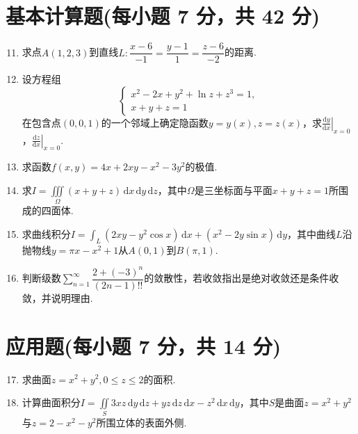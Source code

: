 \documentclass[../Main.tex]{subfiles}
\begin{document}
\section{基本计算题(每小题 7 分，共 42 分)}
\begin{enumerate}
    \setcounter{enumi}{10}
    \item 求点$A(1,2,3)$到直线$L:\dfrac{x-6}{-1}=\dfrac{y-1}{1}=\dfrac{z-6}{-2}$的距离.
          \vspace{11em}

    \item 设方程组
          \[
              \begin{cases}
                  x^{2}-2x+y^{2}+\ln z+z^{3}=1, \\
                  x+y+z=1
              \end{cases}
          \]
          在包含点$(0,0,1)$的一个邻域上确定隐函数$y=y(x),z=z(x)$，求\( \left.\frac{\mathrm{d}y}{\mathrm{d}x}\right|_{x=0}\)，\(\left.\frac{\mathrm{d}z}{\mathrm{d}x}\right|_{x=0} \).
          \vspace{8em}

    \item 求函数$f(x,y)=4x+2xy-x^{2}-3y^{2}$的极值.
          \vspace{8em}

    \item 求$I=\iiint\limits_{\Omega}(x+y+z)\,\mathrm{d}x\,\mathrm{d}y\,\mathrm{d}z$，其中$\Omega$是三坐标面与平面$x+y+z=1$所围成的四面体.
          \vspace{9em}

    \item 求曲线积分$I=\int_{L}(2xy-y^{2}\cos x)\,\mathrm{d}x+(x^{2}-2y\sin x)\,\mathrm{d}y$，其中曲线$L$沿抛物线$y=\pi x-x^{2}+1$从$A(0,1)$到$B(\pi,1)$.
          \vspace{9em}

    \item 判断级数$\displaystyle\sum_{n=1}^{\infty}\dfrac{2+(-3)^{n}}{(2n-1)!!}$的敛散性，若收敛指出是绝对收敛还是条件收敛，并说明理由.
          \vspace{9em}
\end{enumerate}

\section{应用题(每小题 7 分，共 14 分)}
\begin{enumerate}
    \setcounter{enumi}{16}
    \item 求曲面$z=x^{2}+y^{2},0\leq z\leq2$的面积.
          \vspace{10em}

    \item 计算曲面积分$I=\iint\limits_{S}3xz\,\mathrm{d}y\,\mathrm{d}z+yz\,\mathrm{d}z\,\mathrm{d}x-z^{2}\,\mathrm{d}x\,\mathrm{d}y$，其中$S$是曲面$z=x^{2}+y^{2}$与$z=2-x^{2}-y^{2}$所围立体的表面外侧.
          \vspace{10em}
\end{enumerate}
\end{document}
